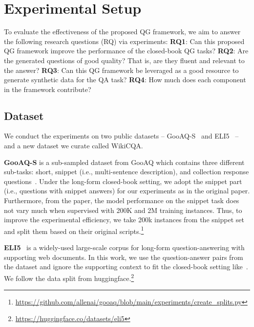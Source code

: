 \documentclass[11pt]{article}
\begin{document}
\section{Experimental Setup}

To evaluate the effectiveness of the proposed QG framework, we aim to answer the following research questions (RQ) via experiments: \textbf{RQ1}: Can this proposed QG framework improve the performance of the closed-book QG tasks? \textbf{RQ2}: Are the generated questions of good quality? That is, are they fluent and relevant to the answer? \textbf{RQ3}: Can this QG framework be leveraged as a good resource to generate synthetic data for the QA task? \textbf{RQ4}: How much does each component in the framework contribute?



\subsection{Dataset}
We conduct the experiments on two public datasets -- GooAQ-S~\cite{khashabi-etal-2021-gooaq-open} and ELI5~\cite{fan-etal-2019-eli5} -- and a new dataset we curate called WikiCQA.

\smallskip
\noindent \textbf{GooAQ-S} is a sub-sampled dataset from GooAQ which contains three different sub-tasks: short, snippet (i.e., multi-sentence description), and collection response questions~\cite{khashabi-etal-2021-gooaq-open}. 
Under the long-form closed-book setting, we adopt the snippet part (i.e., questions with snippet answers) for our experiments as in the original paper.
Furthermore, from the paper, the model performance on the snippet task does not vary much when supervised with 200K and 2M training instances. 
Thus, to improve the experimental efficiency, we take 200k instances from the snippet set and split them based on their original scripts.\footnote{\url{https://github.com/allenai/gooaq/blob/main/experiments/create\_splits.py}}

\smallskip
\noindent \textbf{ELI5}~\cite{fan-etal-2019-eli5} is a widely-used large-scale corpus for long-form question-answering with supporting web documents.
In this work, we use the question-answer pairs from the dataset and ignore the supporting context to fit the closed-book setting like~\cite{khashabi-etal-2021-gooaq-open}.
We follow the data split from huggingface.\footnote{\url{https://huggingface.co/datasets/eli5}}
\end{document}

